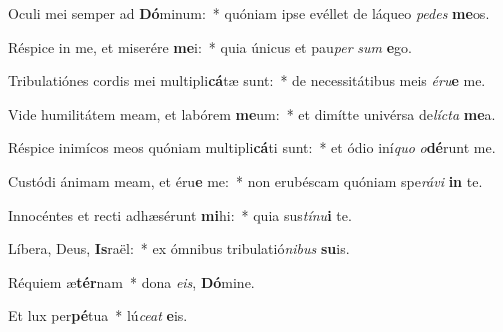 \item Oculi mei semper ad \textbf{Dó}minum:~* quóniam ipse evéllet de láqueo \textit{pe}\textit{des} \textbf{me}os.

\item Réspice in me, et miserére \textbf{me}i:~* quia únicus et pau\textit{per} \textit{sum} \textbf{e}go.

\item Tribulatiónes cordis mei multipli\textbf{cá}tæ sunt:~* de necessitátibus meis \textit{é}\textit{ru}\textbf{e} me.

\item Vide humilitátem meam, et labórem \textbf{me}um:~* et dimítte univérsa de\textit{líc}\textit{ta} \textbf{me}a.

\item Réspice inimícos meos quóniam multipli\textbf{cá}ti sunt:~* et ódio iní\textit{quo} \textit{o}\textbf{dé}runt me.

\item Custódi ánimam meam, et éru\textbf{e} me:~* non erubéscam quóniam spe\textit{rá}\textit{vi} \textbf{in} te.

\item Innocéntes et recti adhæsérunt \textbf{mi}hi:~* quia sus\textit{tí}\textit{nu}\textbf{i} te.

\item Líbera, Deus, \textbf{Is}raël:~* ex ómnibus tribulatió\textit{ni}\textit{bus} \textbf{su}is.

\item Réquiem æ\textbf{tér}nam~* dona \textit{e}\textit{is}, \textbf{Dó}mine.

\item Et lux per\textbf{pé}tua~* lú\textit{ce}\textit{at} \textbf{e}is.